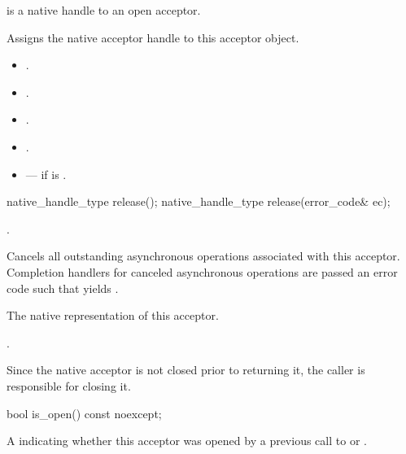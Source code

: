 \begin{itemdescr}
\pnum
\expects {} is a native handle to an open acceptor.

\pnum
\effects Assigns the native acceptor handle to this acceptor object.

\pnum
\postconditions
\begin{itemize}
\item
{}.
\item
{}.
\item
{}.
\item
{}.
\end{itemize}

\pnum
\errors
\begin{itemize}
\item
{} --- if  is .
\end{itemize}
\end{itemdescr}

\begin{itemdecl}
native_handle_type release();
native_handle_type release(error_code& ec);
\end{itemdecl}

\begin{itemdescr}
\pnum
\expects {}.

\pnum
\effects Cancels all outstanding asynchronous operations associated with this acceptor.
Completion handlers for canceled asynchronous operations are passed an error code 
such that  yields .

\pnum
\returns The native representation of this acceptor.

\pnum
\postconditions {}.

\pnum
\remarks Since the native acceptor is not closed prior to returning it,
the caller is responsible for closing it.
\end{itemdescr}

\begin{itemdecl}
bool is_open() const noexcept;
\end{itemdecl}

\begin{itemdescr}
\pnum
\returns A  indicating whether this acceptor was opened by a previous call to  or .
\end{itemdescr}

